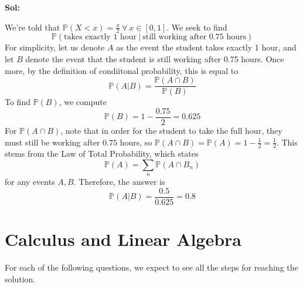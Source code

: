 \documentclass[11pt]{article}
\newcommand{\PP}{\mathbb{P}}
\begin{document}
\begin{enumerate}
  \textbf{Sol:}

We're told that $\PP(X < x) = \frac{x}{2} \ \forall \ x \in [0, 1]$. We seek to find
\[\PP(\text{takes exactly 1 hour} \ | \ \text{still working after 0.75 hours})\]
For simplicity, let us denote $A$ as the event the student takes exactly 1 hour, 
and let $B$ denote the event that the student is still working after 0.75 hours.
Once more, by the definition of condiitonal probability, this is equal to
\[\PP(A | B) = \dfrac{\PP(A \cap B)}{\PP(B)}\]
To find $\PP(B)$, we compute
\[\PP(B) = 1 - \frac{0.75}{2} = 0.625\]
For $\PP(A \cap B)$, note that in order for the student to take the full hour, they must still be 
working after $0.75$ hours, so $\PP(A \cap B) = \PP(A) = 1 - \frac{1}{2} = \frac{1}{2}$. 
This stems from the Law of Total Probability, which states 
\[\PP(A) = \sum_n \PP(A \cap B_n)\]
for any events $A, B$. 
Therefore, the answer is 
\[\PP(A | B) = \frac{0.5}{0.625} = 0.8\]
  
  \newpage
\end{enumerate}

\section{Calculus and Linear Algebra}

 For each of the following questions, we expect to see all the steps for reaching the solution.
	
\end{document}
